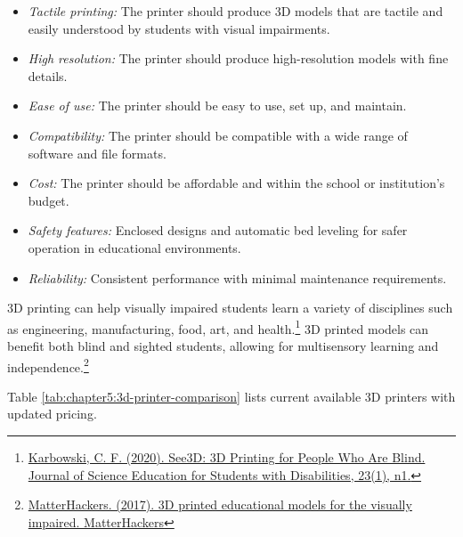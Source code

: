 \begin{itemize}
    \item \emph{Tactile printing:} The printer should produce 3D models that are tactile and easily understood by students with visual impairments.
    \item \emph{High resolution:} The printer should produce high-resolution models with fine details.
    \item \emph{Ease of use:} The printer should be easy to use, set up, and maintain.
    \item \emph{Compatibility:} The printer should be compatible with a wide range of software and file formats.
    \item \emph{Cost:} The printer should be affordable and within the school or institution's budget.
    \item \emph{Safety features:} Enclosed designs and automatic bed leveling for safer operation in educational environments.
    \item \emph{Reliability:} Consistent performance with minimal maintenance requirements.
\end{itemize}

3D printing can help visually impaired students learn a variety of disciplines such as engineering, manufacturing, food, art, and health.\footnote{\href{http://files.eric.ed.gov/fulltext/EJ1247154.pdf}{Karbowski, C. F. (2020). See3D: 3D Printing for People Who Are Blind. Journal of Science Education for Students with Disabilities, 23(1), n1.}} 3D printed models can benefit both blind and sighted students, allowing for multisensory learning and independence.\footnote{\href{http://www.matterhackers.com/articles/3d-printed-educational-models-for-the-visually-impaired}{MatterHackers. (2017). 3D printed educational models for the visually impaired. MatterHackers}}

Table \ref{tab:chapter5:3d-printer-comparison} lists current available 3D printers with updated pricing.

